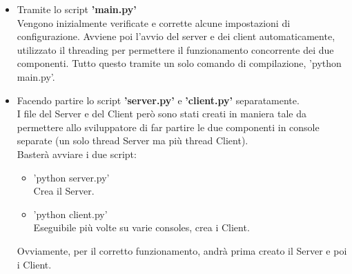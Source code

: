 \documentclass[a4paper,12pt]{report}
\begin{document}
        \begin{itemize}
            \item Tramite lo script \textbf{'main.py'}\\
            Vengono inizialmente verificate e corrette alcune impostazioni di configurazione.
            Avviene poi l'avvio del server e dei client automaticamente, utilizzato il threading per permettere il funzionamento concorrente dei due componenti.
            Tutto questo tramite un solo comando di compilazione, 'python main.py'.
            \item Facendo partire lo script \textbf{'server.py'} e \textbf{'client.py'} separatamente.\\
            I file del Server e del Client però sono stati creati in maniera tale da permettere allo sviluppatore di far partire le due componenti in console separate (un solo thread Server ma più thread Client).\\
            Basterà avviare i due script:
            \begin{itemize}
                \item 'python server.py'\\
                    Crea il Server.
                \item 'python client.py'\\
                    Eseguibile più volte su varie consoles, crea i Client. 
            \end{itemize}
            Ovviamente, per il corretto funzionamento, andrà prima creato il Server e poi i Client.
        \end{itemize}
\end{document}
